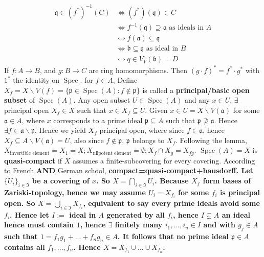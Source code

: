 \documentclass[12pt]{article}
\theoremstyle{definition}
\theoremstyle{plain}
\DeclareMathOperator{\Spec}{Spec}
\begin{document}
\begin{align*}
  \mathfrak{q}\in (f^*)^{-1}(C) &\iff (f^*)(\mathfrak{q})\in C\\
   &\iff f^{-1}(\mathfrak{q})\supseteq \mathfrak{a} \text{ as ideals in } A\\
    &\iff f(\mathfrak{a})\subseteq \mathfrak{q}\\
    &\iff \mathfrak{b}\subseteq \mathfrak{q}\text{ as ideal in }B\\
    &\iff q\in V_Y(\mathfrak{b})=D
\end{align*}
\Prop If $f:A\to B$, and $g:B\to C$ are ring homomorphisms. Then $(g\cdot f)^*=f^*\cdot g^*$ with $1^*$ the identity on $\Spec$.
\Def for $f\in A$, Define $X_f=X\backslash V(f)=\{\mathfrak{p}\in \Spec(A):f\notin\mathfrak{p}\}$ is called a \textbf{principal/basic open subset} of $\Spec(A)$.
\Lemma Any open subset $U\in \Spec(A)$ and any $x\in U$, $\exists$ principal open $X_f\in X$ such that $x\in X_f\subseteq U$.
\proof Given $x\in U=X\backslash V(\mathfrak{a})$ for some $\mathfrak{a}\in A$, where $x$ corresponds to a prime ideal $\mathfrak{p}\subseteq A$ such that $\mathfrak{p}\not\supseteq \mathfrak{a}$. Hence $\exists f\in \mathfrak{a}\backslash \mathfrak{p}$, Hence we yield $X_f$ principal open, where since $f\in \mathfrak{a}$, hence $X_f\subseteq A\backslash V(\mathfrak{a})=U$, also since $f\notin \mathfrak{p}$, $\mathfrak{p}$ belongs to $X_f$.
\Rmk Following the lemma, $X_{\text{invertible element}}=X_1=X; X_{\text{nilpotent element}}=\emptyset; X_f\cap X_g=X_{fg}$.
\Prop $\Spec(A)=X$ is \textbf{quasi-compact} if $X$ assumes a finite-subcovering for every covering.
\Rmk According to French \textbf{AND} German school, \bf{compact=quasi-compact+hausdorff}.
\proof Let $\{U_i\}_{i\in \mathfrak{I}}$ be a covering of $x$. So $X=\bigcap_{i\in \mathfrak{I}}U_i$. Because $X_f$ form bases of Zariski-topology, hence we may assume $U_i=X_{f_i}$ for some $f_i$ is principal open. So $X=\bigcup_{i\in \mathfrak{I}}X_{f_i}$, equivalent to say every prime ideals avoid some $f_i$. Hence let $I:=$ ideal in $A$ generated by all $f_i$, hence $I\subsetneq A$ an ideal hence must contain $1$, hence $\exists$ finitely many $i_1,..., i_n\in I$ and with $g_j\in A$ such that $1=f_1g_1+...+f_ng_n\in A$. It follows that no prime ideal $\mathfrak{p}\in A$ contains all $f_1, ..., f_n$. Hence $X=X_{f_1}\cup...\cup X_{f_n}$.

\bigskip
\end{document}
